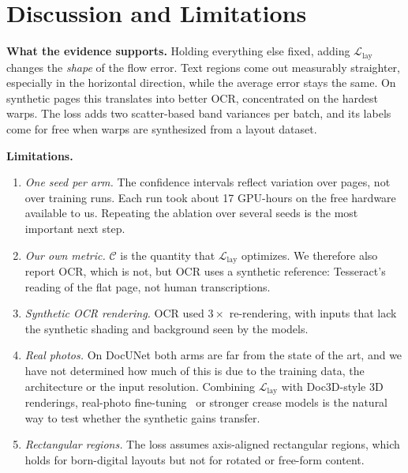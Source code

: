 \documentclass[conference]{IEEEtran}
\newcommand{\Llay}{\mathcal{L}_{\mathrm{lay}}}
\newcommand{\Cm}{\mathcal{C}}
\begin{document}
\section{Discussion and Limitations}
\label{sec:limits}
\textbf{What the evidence supports.} Holding everything else fixed, adding $\Llay$ changes the \emph{shape} of the flow error. Text regions come out measurably straighter, especially in the horizontal direction, while the average error stays the same. On synthetic pages this translates into better OCR, concentrated on the hardest warps. The loss adds two scatter-based band variances per batch, and its labels come for free when warps are synthesized from a layout dataset.

\textbf{Limitations.}
\begin{enumerate}
\item \emph{One seed per arm.} The confidence intervals reflect variation over pages, not over training runs. Each run took about 17 GPU-hours on the free hardware available to us. Repeating the ablation over several seeds is the most important next step.
\item \emph{Our own metric.} $\Cm$ is the quantity that $\Llay$ optimizes. We therefore also report OCR, which is not, but OCR uses a synthetic reference: Tesseract's reading of the flat page, not human transcriptions.
\item \emph{Synthetic OCR rendering.} OCR used $3\times$ re-rendering, with inputs that lack the synthetic shading and background seen by the models.
\item \emph{Real photos.} On DocUNet both arms are far from the state of the art, and we have not determined how much of this is due to the training data, the architecture or the input resolution. Combining $\Llay$ with Doc3D-style 3D renderings, real-photo fine-tuning~\cite{ma2022paperedge} or stronger crease models is the natural way to test whether the synthetic gains transfer.
\item \emph{Rectangular regions.} The loss assumes axis-aligned rectangular regions, which holds for born-digital layouts but not for rotated or free-form content.
\end{enumerate}

\end{document}
